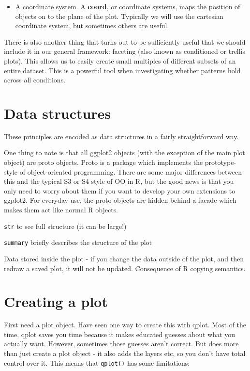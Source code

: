 \begin{itemize}
  \item A coordinate system.  A {\bf coord}, or coordinate systems, maps the position of objects on to the plane of the plot.  Typically we will use the cartesian coordinate system, but sometimes others are useful.
\end{itemize}

There is also another thing that turns out to be sufficiently useful that we should include it in our general framework: faceting (also known as conditioned or trellis plots). This allows us to easily create small multiples of different subsets of an entire dataset. This is a powerful tool when investigating whether patterns hold across all conditions.


\section{Data structures}
\label{sec:data_structures}

These principles are encoded as data structures in a fairly straightforward way.

One thing to note is that all ggplot2 objects (with the exception of the main plot object) are proto objects.  Proto is a package which implements the prototype-style of object-oriented programming.  There are some major differences between this and the typical S3 or S4 style of OO in R, but the good news is that you only need to worry about them if you want to develop your own extensions to ggplot2.  For everyday use, the proto objects are hidden behind a facade which makes them act like normal R objects.

{\tt str} to see full structure (it can be large!)

{\tt summary} briefly describes the structure of the plot

Data stored inside the plot - if you change the data outside of the plot, and then redraw a saved plot, it will not be updated.  Consequence of R copying semantics.

\section{Creating a plot}
\label{sec:ggplot}

First need a plot object.  Have seen one way to create this with qplot.  Most of the time, qplot saves you time because it makes educated guesses about what you actually want.  However, sometimes those guesses aren't correct.  But does more than just create a plot object - it also adds the layers etc, so you don't have total control over it. This means that {\tt qplot()} has some limitations:

